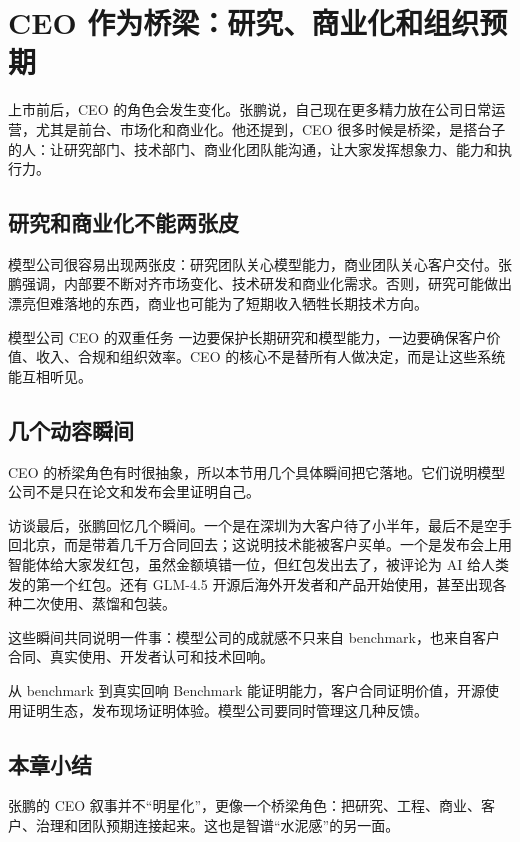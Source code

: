 \section{CEO 作为桥梁：研究、商业化和组织预期}

上市前后，CEO 的角色会发生变化。张鹏说，自己现在更多精力放在公司日常运营，尤其是前台、市场化和商业化。他还提到，CEO 很多时候是桥梁，是搭台子的人：让研究部门、技术部门、商业化团队能沟通，让大家发挥想象力、能力和执行力。

\subsection{研究和商业化不能两张皮}

模型公司很容易出现两张皮：研究团队关心模型能力，商业团队关心客户交付。张鹏强调，内部要不断对齐市场变化、技术研发和商业化需求。否则，研究可能做出漂亮但难落地的东西，商业也可能为了短期收入牺牲长期技术方向。

\begin{importantbox}{模型公司 CEO 的双重任务}
一边要保护长期研究和模型能力，一边要确保客户价值、收入、合规和组织效率。CEO 的核心不是替所有人做决定，而是让这些系统能互相听见。
\end{importantbox}

\subsection{几个动容瞬间}

CEO 的桥梁角色有时很抽象，所以本节用几个具体瞬间把它落地。它们说明模型公司不是只在论文和发布会里证明自己。

访谈最后，张鹏回忆几个瞬间。一个是在深圳为大客户待了小半年，最后不是空手回北京，而是带着几千万合同回去；这说明技术能被客户买单。一个是发布会上用智能体给大家发红包，虽然金额填错一位，但红包发出去了，被评论为 AI 给人类发的第一个红包。还有 GLM-4.5 开源后海外开发者和产品开始使用，甚至出现各种二次使用、蒸馏和包装。

这些瞬间共同说明一件事：模型公司的成就感不只来自 benchmark，也来自客户合同、真实使用、开发者认可和技术回响。

\begin{knowledgebox}{从 benchmark 到真实回响}
Benchmark 能证明能力，客户合同证明价值，开源使用证明生态，发布现场证明体验。模型公司要同时管理这几种反馈。
\end{knowledgebox}

\subsection{本章小结}

张鹏的 CEO 叙事并不“明星化”，更像一个桥梁角色：把研究、工程、商业、客户、治理和团队预期连接起来。这也是智谱“水泥感”的另一面。

